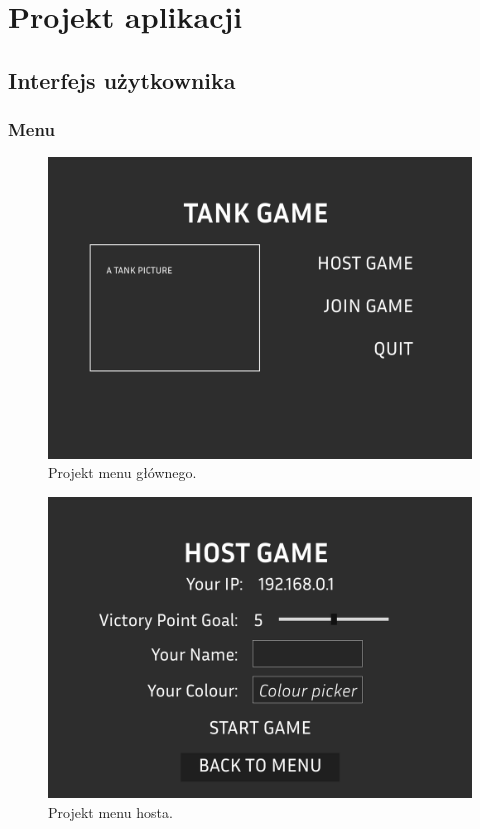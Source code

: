 \chapter{Projekt aplikacji}

\section{Interfejs użytkownika}
\subsection{Menu}

\begin{figure}
    \centering
    \includegraphics[width=.8\linewidth]{Images/design/Main Menu.png}
    \caption{Projekt menu głównego.}
    \label{fig:main_menu}
\end{figure}

\begin{figure}
    \centering
    \includegraphics[width=.8\linewidth]{Images/design/Host Menu.png}
    \caption{Projekt menu hosta.}
    \label{fig:host_menu}
\end{figure}

